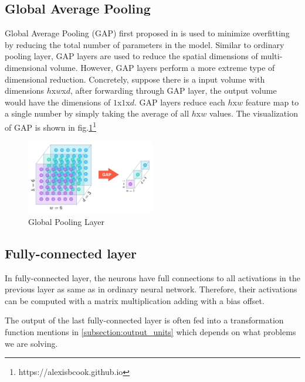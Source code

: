 \subsection{Global Average Pooling}
\hspace{0.45cm}Global Average Pooling (GAP) first proposed in \cite{netinnet} is used to minimize 
overfitting by reducing the total number of parameters in the model. Similar to ordinary pooling layer, 
GAP layers are used to reduce the spatial dimensions of multi-dimensional volume. 
However, GAP layers perform a more extreme type of dimensional reduction. 
Concretely, suppose there is a input volume with dimensions $h$x$w$x$d$, after forwarding through GAP layer, 
the output volume would have the dimensions of $1$x$1$x$d$. GAP layers reduce each $h$x$w$ 
feature map to a single number by simply taking the average of all $h$x$w$ values. 
The visualization of GAP is shown in fig.\ref{fig:gap}\footnote{https://alexisbcook.github.io}
\begin{figure}[h!]
    \centering
    \includegraphics[width=0.5\textwidth]{Chapters/Fig/gap.png}
    \caption{Global Pooling Layer}
    \label{fig:gap}
\end{figure}
\subsection{Fully-connected layer}
\hspace{0.45cm} In fully-connected layer, the neurons have full connections to all activations in 
the previous layer as same as in ordinary neural network. 
Therefore, their activations can be computed with a matrix multiplication adding with a bias offset.\par
The output of the last fully-connected layer is often fed into a transformation function mentions in \autoref{subsection:output_units} which depends on what problems we are solving.
